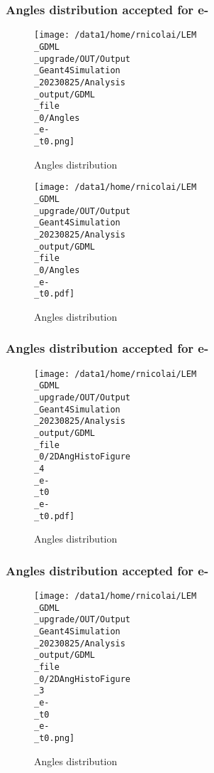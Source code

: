 \documentclass[8pt]{beamer}
\begin{document}
            \begin{frame}
                \frametitle{Angles distribution accepted for e-}
            
        \begin{figure}[h]
            \centering
            \texttt{[image: /data1/home/rnicolai/LEM\\\_GDML\\\_upgrade/OUT/Output\\\_Geant4Simulation\\\_20230825/Analysis\\\_output/GDML\\\_file\\\_0/Angles\\\_e-\\\_t0.png]}
            \caption{Angles distribution}
        \end{figure}
        
        \begin{figure}[h]
            \centering
            \texttt{[image: /data1/home/rnicolai/LEM\\\_GDML\\\_upgrade/OUT/Output\\\_Geant4Simulation\\\_20230825/Analysis\\\_output/GDML\\\_file\\\_0/Angles\\\_e-\\\_t0.pdf]}
            \caption{Angles distribution}
        \end{figure}
        
            \end{frame}
            
            \begin{frame}
                \frametitle{Angles distribution accepted for e-}
            
        \begin{figure}[h]
            \centering
            \texttt{[image: /data1/home/rnicolai/LEM\\\_GDML\\\_upgrade/OUT/Output\\\_Geant4Simulation\\\_20230825/Analysis\\\_output/GDML\\\_file\\\_0/2DAngHistoFigure\\\_4\\\_e-\\\_t0\\\_e-\\\_t0.pdf]}
            \caption{Angles distribution}
        \end{figure}
        
            \end{frame}
            
            \begin{frame}
                \frametitle{Angles distribution accepted for e-}
            
        \begin{figure}[h]
            \centering
            \texttt{[image: /data1/home/rnicolai/LEM\\\_GDML\\\_upgrade/OUT/Output\\\_Geant4Simulation\\\_20230825/Analysis\\\_output/GDML\\\_file\\\_0/2DAngHistoFigure\\\_3\\\_e-\\\_t0\\\_e-\\\_t0.png]}
            \caption{Angles distribution}
        \end{figure}
        
            \end{frame}
            
\end{document}
